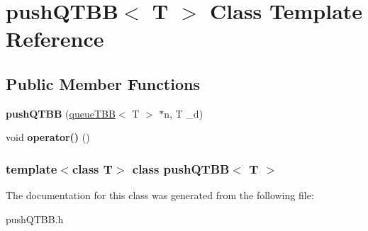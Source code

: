 \hypertarget{classpushQTBB}{
\section{pushQTBB$<$ T $>$ Class Template Reference}
\label{classpushQTBB}
}
\subsection*{Public Member Functions}
\begin{DoxyCompactItemize}
\item 
\hypertarget{classpushQTBB_ad6587d11f6c5fd21c887d925161971cc}{
{\bfseries pushQTBB} (\hyperlink{classqueueTBB}{queueTBB}$<$ T $>$ $\ast$n, T \_\-d)}
\label{classpushQTBB_ad6587d11f6c5fd21c887d925161971cc}

\item 
\hypertarget{classpushQTBB_a85f6603f95040806e2b08939bebc1930}{
void {\bfseries operator()} ()}
\label{classpushQTBB_a85f6603f95040806e2b08939bebc1930}

\end{DoxyCompactItemize}
\subsubsection*{template$<$class T$>$ class pushQTBB$<$ T $>$}



The documentation for this class was generated from the following file:\begin{DoxyCompactItemize}
\item 
pushQTBB.h\end{DoxyCompactItemize}
